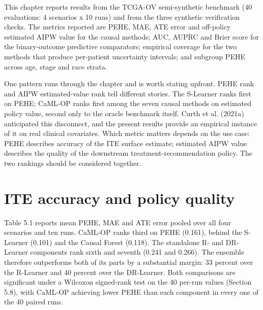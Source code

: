 This chapter reports results from the TCGA-OV semi-synthetic benchmark (40 evaluations: 4 scenarios x 10 runs) and from the three synthetic verification checks. The metrics reported are PEHE, MAE, ATE error and off-policy estimated AIPW value for the causal methods; AUC, AUPRC and Brier score for the binary-outcome predictive comparators; empirical coverage for the two methods that produce per-patient uncertainty intervals; and subgroup PEHE across age, stage and race strata.

One pattern runs through the chapter and is worth stating upfront. PEHE rank and AIPW estimated-value rank tell different stories. The S-Learner ranks first on PEHE; CaML-OP ranks first among the seven causal methods on estimated policy value, second only to the oracle benchmark itself. Curth et al. (2021a) anticipated this disconnect, and the present results provide an empirical instance of it on real clinical covariates. Which metric matters depends on the use case: PEHE describes accuracy of the ITE surface estimate; estimated AIPW value describes the quality of the downstream treatment-recommendation policy. The two rankings should be considered together.

\section{ITE accuracy and policy quality}\label{ite-accuracy-and-policy-quality}

Table 5.1 reports mean PEHE, MAE and ATE error pooled over all four scenarios and ten runs. CaML-OP ranks third on PEHE (0.161), behind the S-Learner (0.101) and the Causal Forest (0.118). The standalone R- and DR-Learner components rank sixth and seventh (0.241 and 0.266). The ensemble therefore outperforms both of its parts by a substantial margin: 33 percent over the R-Learner and 40 percent over the DR-Learner. Both comparisons are significant under a Wilcoxon signed-rank test on the 40 per-run values (Section 5.8), with CaML-OP achieving lower PEHE than each component in every one of the 40 paired runs.

\setcounter{table}{0}

